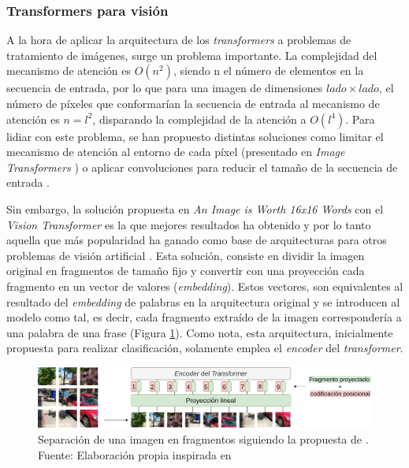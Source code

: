 \documentclass[a4paper]{article}
\begin{document}
\subsubsection{Transformers para visión}

A la hora de aplicar la arquitectura de los \textit{transformers} a problemas de tratamiento de imágenes, surge un problema importante. La complejidad del mecanismo de atención es $O(n^{2})$, siendo n el número de elementos en la secuencia de entrada, por lo que para una imagen de dimensiones $lado \times lado$, el número de píxeles que conformarían la secuencia de entrada al mecanismo de atención es $n = l^2$, disparando la complejidad de la atención a $O(l^{4})$. Para lidiar con este problema, se han propuesto distintas soluciones como limitar el mecanismo de atención al entorno de cada píxel (presentado en \textit{Image Transformers} \cite{image_transformer}) o aplicar convoluciones para reducir el tamaño de la secuencia de entrada \cite{detrfacebookdetectiontransformers}. 

Sin embargo, la solución propuesta en \textit{An Image is Worth 16x16 Words} con el \textit{Vision Transformer} \cite{image16x16words} es la que mejores resultados ha obtenido y por lo tanto aquella que más popularidad ha ganado como base de arquitecturas para otros problemas de visión artificial \cite{visiontransformersDPT, bhat2020adabins, chen2021transunet, liu2021Swin}. Esta solución, consiste en dividir la imagen original en fragmentos de tamaño fijo y convertir con una proyección cada fragmento en un vector de valores (\textit{embedding}). Estos vectores, son equivalentes al resultado del \textit{embedding} de palabras en la arquitectura original y se introducen al modelo como tal, es decir, cada fragmento extraído de la imagen correspondería a una palabra de una frase (Figura \ref{fig:vision-transformer}). Como nota, esta arquitectura, inicialmente propuesta para realizar clasificación, solamente emplea el \textit{encoder} del \textit{transformer}.

\begin{figure}[H]
\centering
\includegraphics[width=1\linewidth]{imagenes/vision-transformer.png} 
\captionsetup{width=.8\linewidth}
\caption{Separación de una imagen en fragmentos siguiendo la propuesta de \cite{image16x16words}. Fuente: Elaboración propia inspirada en \cite{image16x16words}}
\label{fig:vision-transformer}
\end{figure}
\end{document}

